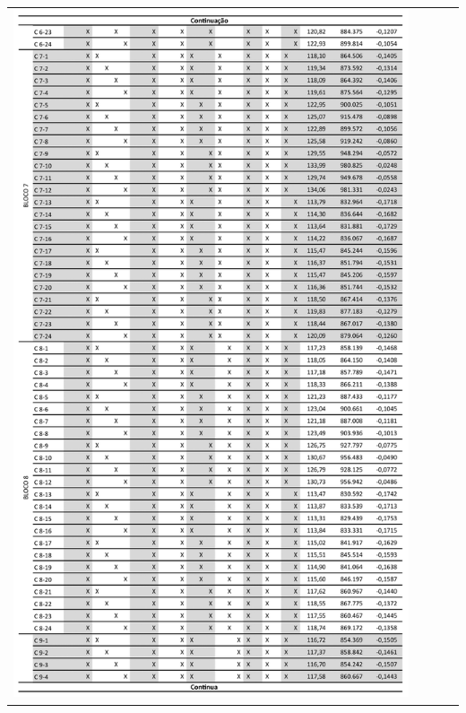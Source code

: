 \begin{table}[H]
    \centering
    \begin{tabular}{l}
        \includegraphics[width=0.9\textwidth]{figures/appendices/tabela03.png}
    \end{tabular}
\end{table}
\pagebreak
